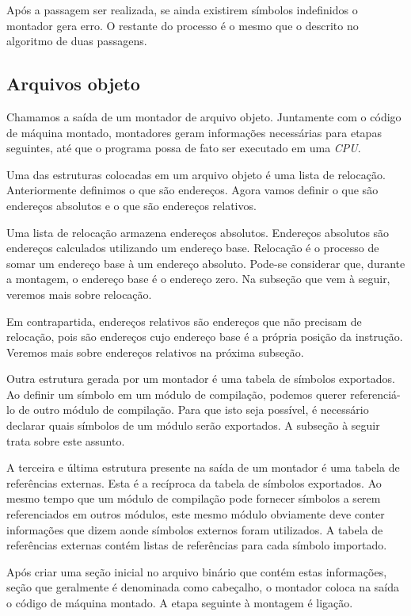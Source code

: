 Após a passagem ser realizada, se ainda existirem símbolos indefinidos o
montador gera erro. O restante do processo é o mesmo que o descrito no algoritmo
de duas passagens.

\subsection{Arquivos objeto}

Chamamos a saída de um montador de arquivo objeto. Juntamente com o código de
máquina montado, montadores geram informações necessárias para etapas seguintes,
até que o programa possa de fato ser executado em uma \textit{CPU}.

Uma das estruturas colocadas em um arquivo objeto é uma lista de
relocação. Anteriormente definimos o que são endereços. Agora vamos definir o
que são endereços absolutos e o que são endereços relativos.

Uma lista de relocação armazena endereços absolutos. Endereços absolutos são
endereços calculados utilizando um endereço base. Relocação é o processo de
somar um endereço base à um endereço absoluto. Pode-se considerar que, durante a
montagem, o endereço base é o endereço zero. Na subseção que vem à seguir,
veremos mais sobre relocação.

Em contrapartida, endereços relativos são endereços que não precisam de
relocação, pois são endereços cujo endereço base é a própria posição da
instrução. Veremos mais sobre endereços relativos na próxima subseção.

Outra estrutura gerada por um montador é uma tabela de símbolos exportados. Ao
definir um símbolo em um módulo de compilação, podemos querer referenciá-lo de
outro módulo de compilação. Para que isto seja possível, é necessário declarar
quais símbolos de um módulo serão exportados. A subseção à seguir trata sobre
este assunto.

A terceira e última estrutura presente na saída de um montador é uma tabela de
referências externas. Esta é a recíproca da tabela de símbolos exportados. Ao
mesmo tempo que um módulo de compilação pode fornecer símbolos a serem
referenciados em outros módulos, este mesmo módulo obviamente deve conter
informações que dizem aonde símbolos externos foram utilizados. A tabela de
referências externas contém listas de referências para cada símbolo importado.

Após criar uma seção inicial no arquivo binário que contém estas informações,
seção que geralmente é denominada como cabeçalho, o montador coloca na saída o
código de máquina montado. A etapa seguinte à montagem é ligação.

